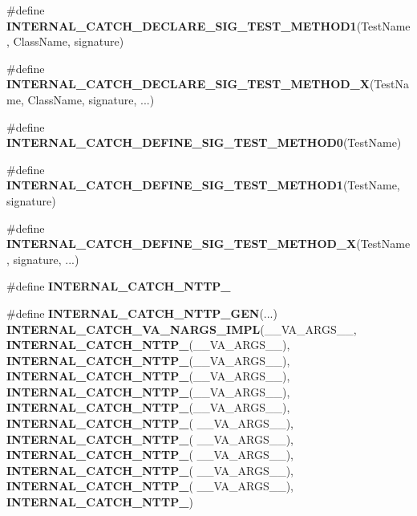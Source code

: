 \begin{DoxyCompactItemize}
\item 
\#define \textbf{ I\+N\+T\+E\+R\+N\+A\+L\+\_\+\+C\+A\+T\+C\+H\+\_\+\+D\+E\+C\+L\+A\+R\+E\+\_\+\+S\+I\+G\+\_\+\+T\+E\+S\+T\+\_\+\+M\+E\+T\+H\+O\+D1}(Test\+Name,  Class\+Name,  signature)
\item 
\#define \textbf{ I\+N\+T\+E\+R\+N\+A\+L\+\_\+\+C\+A\+T\+C\+H\+\_\+\+D\+E\+C\+L\+A\+R\+E\+\_\+\+S\+I\+G\+\_\+\+T\+E\+S\+T\+\_\+\+M\+E\+T\+H\+O\+D\+\_\+X}(Test\+Name,  Class\+Name,  signature, ...)
\item 
\#define \textbf{ I\+N\+T\+E\+R\+N\+A\+L\+\_\+\+C\+A\+T\+C\+H\+\_\+\+D\+E\+F\+I\+N\+E\+\_\+\+S\+I\+G\+\_\+\+T\+E\+S\+T\+\_\+\+M\+E\+T\+H\+O\+D0}(Test\+Name)
\item 
\#define \textbf{ I\+N\+T\+E\+R\+N\+A\+L\+\_\+\+C\+A\+T\+C\+H\+\_\+\+D\+E\+F\+I\+N\+E\+\_\+\+S\+I\+G\+\_\+\+T\+E\+S\+T\+\_\+\+M\+E\+T\+H\+O\+D1}(Test\+Name,  signature)
\item 
\#define \textbf{ I\+N\+T\+E\+R\+N\+A\+L\+\_\+\+C\+A\+T\+C\+H\+\_\+\+D\+E\+F\+I\+N\+E\+\_\+\+S\+I\+G\+\_\+\+T\+E\+S\+T\+\_\+\+M\+E\+T\+H\+O\+D\+\_\+X}(Test\+Name,  signature, ...)
\item 
\#define \textbf{ I\+N\+T\+E\+R\+N\+A\+L\+\_\+\+C\+A\+T\+C\+H\+\_\+\+N\+T\+T\+P\+\_}
\item 
\#define \textbf{ I\+N\+T\+E\+R\+N\+A\+L\+\_\+\+C\+A\+T\+C\+H\+\_\+\+N\+T\+T\+P\+\_\+\+G\+EN}(...)~\textbf{ I\+N\+T\+E\+R\+N\+A\+L\+\_\+\+C\+A\+T\+C\+H\+\_\+\+V\+A\+\_\+\+N\+A\+R\+G\+S\+\_\+\+I\+M\+PL}(\+\_\+\+\_\+\+V\+A\+\_\+\+A\+R\+G\+S\+\_\+\+\_\+, \textbf{ I\+N\+T\+E\+R\+N\+A\+L\+\_\+\+C\+A\+T\+C\+H\+\_\+\+N\+T\+T\+P\+\_}(\+\_\+\+\_\+\+V\+A\+\_\+\+A\+R\+G\+S\+\_\+\+\_\+), \textbf{ I\+N\+T\+E\+R\+N\+A\+L\+\_\+\+C\+A\+T\+C\+H\+\_\+\+N\+T\+T\+P\+\_}(\+\_\+\+\_\+\+V\+A\+\_\+\+A\+R\+G\+S\+\_\+\+\_\+), \textbf{ I\+N\+T\+E\+R\+N\+A\+L\+\_\+\+C\+A\+T\+C\+H\+\_\+\+N\+T\+T\+P\+\_}(\+\_\+\+\_\+\+V\+A\+\_\+\+A\+R\+G\+S\+\_\+\+\_\+), \textbf{ I\+N\+T\+E\+R\+N\+A\+L\+\_\+\+C\+A\+T\+C\+H\+\_\+\+N\+T\+T\+P\+\_}(\+\_\+\+\_\+\+V\+A\+\_\+\+A\+R\+G\+S\+\_\+\+\_\+), \textbf{ I\+N\+T\+E\+R\+N\+A\+L\+\_\+\+C\+A\+T\+C\+H\+\_\+\+N\+T\+T\+P\+\_}(\+\_\+\+\_\+\+V\+A\+\_\+\+A\+R\+G\+S\+\_\+\+\_\+), \textbf{ I\+N\+T\+E\+R\+N\+A\+L\+\_\+\+C\+A\+T\+C\+H\+\_\+\+N\+T\+T\+P\+\_}( \+\_\+\+\_\+\+V\+A\+\_\+\+A\+R\+G\+S\+\_\+\+\_\+), \textbf{ I\+N\+T\+E\+R\+N\+A\+L\+\_\+\+C\+A\+T\+C\+H\+\_\+\+N\+T\+T\+P\+\_}( \+\_\+\+\_\+\+V\+A\+\_\+\+A\+R\+G\+S\+\_\+\+\_\+), \textbf{ I\+N\+T\+E\+R\+N\+A\+L\+\_\+\+C\+A\+T\+C\+H\+\_\+\+N\+T\+T\+P\+\_}( \+\_\+\+\_\+\+V\+A\+\_\+\+A\+R\+G\+S\+\_\+\+\_\+), \textbf{ I\+N\+T\+E\+R\+N\+A\+L\+\_\+\+C\+A\+T\+C\+H\+\_\+\+N\+T\+T\+P\+\_}( \+\_\+\+\_\+\+V\+A\+\_\+\+A\+R\+G\+S\+\_\+\+\_\+),\textbf{ I\+N\+T\+E\+R\+N\+A\+L\+\_\+\+C\+A\+T\+C\+H\+\_\+\+N\+T\+T\+P\+\_}( \+\_\+\+\_\+\+V\+A\+\_\+\+A\+R\+G\+S\+\_\+\+\_\+), \textbf{ I\+N\+T\+E\+R\+N\+A\+L\+\_\+\+C\+A\+T\+C\+H\+\_\+\+N\+T\+T\+P\+\_})

\end{DoxyCompactItemize}
